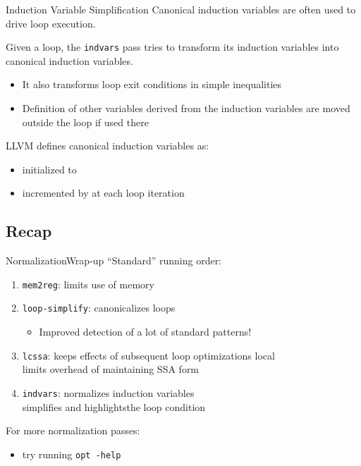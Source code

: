 \begin{frame}{Induction Variable Simplification}
Canonical induction variables are often used to \alert{drive} loop execution.

\vfill

Given a loop, the \texttt{indvars} pass tries to transform its induction variables
into \alert{canonical} induction variables.
\begin{itemize}
\item It also transforms loop exit conditions in simple inequalities
\item Definition of other variables derived from the induction variables
      are moved outside the loop if used there
\end{itemize}

\vfill
LLVM defines canonical induction variables as:

\begin{itemize}
\item initialized to 
\item incremented by  at each loop iteration
\end{itemize}
\end{frame}


\subsection{Recap}


\begin{frame}{Normalization}{Wrap-up}
``Standard'' running order:

\begin{enumerate}
\item \texttt{mem2reg}: limits use of memory
\item \texttt{loop-simplify}: canonicalizes loops
	\begin{itemize}
	\item Improved detection of a lot of standard patterns!
	\end{itemize}
\item \texttt{lcssa}: keeps effects of subsequent loop optimizations local\\
      limits overhead of maintaining SSA form
\item \texttt{indvars}: normalizes induction variables\\
			simplifies and highlightsthe loop condition
\end{enumerate}

\vfill
For more normalization passes:

\begin{itemize}
\item try running \texttt{opt -help}
\end{itemize}
\end{frame}

